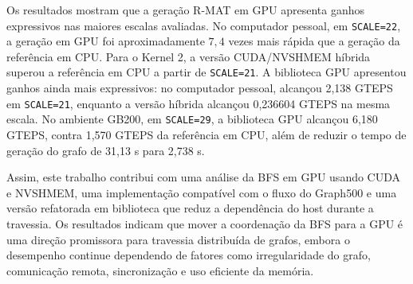 Os resultados mostram que a geração R-MAT em GPU apresenta ganhos expressivos nas
maiores escalas avaliadas. No computador pessoal, em \texttt{SCALE=22}, a geração
em GPU foi aproximadamente $7{,}4$ vezes mais rápida que a geração da referência
em CPU. Para o Kernel 2, a versão CUDA/NVSHMEM híbrida superou a referência em
CPU a partir de \texttt{SCALE=21}. A biblioteca GPU apresentou ganhos ainda mais
expressivos: no computador pessoal, alcançou 2,138 GTEPS em \texttt{SCALE=21},
enquanto a versão híbrida alcançou 0,236604 GTEPS na mesma escala. No ambiente
GB200, em \texttt{SCALE=29}, a biblioteca GPU alcançou 6,180 GTEPS, contra 1,570
GTEPS da referência em CPU, além de reduzir o tempo de geração do grafo de 31,13
s para 2,738 s.

Assim, este trabalho contribui com uma análise da BFS em GPU usando CUDA e
NVSHMEM, uma implementação compatível com o fluxo do Graph500 e uma versão
refatorada em biblioteca que reduz a dependência do host durante a travessia. Os
resultados indicam que mover a coordenação da BFS para a GPU é uma direção
promissora para travessia distribuída de grafos, embora o desempenho continue
dependendo de fatores como irregularidade do grafo, comunicação remota,
sincronização e uso eficiente da memória.
